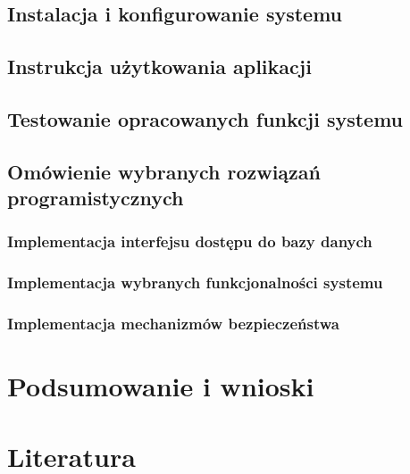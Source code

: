 \documentclass[12pt]{article}
\begin{document}
\subsection{Instalacja i konfigurowanie systemu}
\subsection{Instrukcja użytkowania aplikacji}
\subsection{Testowanie opracowanych funkcji systemu}
\subsection{Omówienie wybranych rozwiązań programistycznych}
\subsubsection{Implementacja interfejsu dostępu do bazy danych}
\subsubsection{Implementacja wybranych funkcjonalności systemu}
\subsubsection{Implementacja mechanizmów bezpieczeństwa}


\section{Podsumowanie i wnioski}


\section{Literatura}
\end{document}
